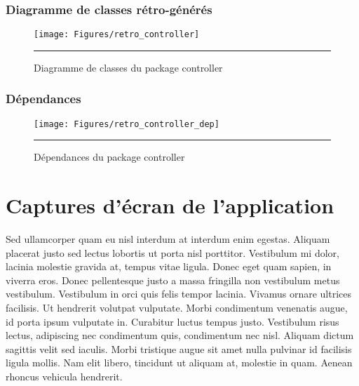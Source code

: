 \subsubsection{Diagramme de classes rétro-générés}
\begin{figure}[H]
	\centering
		\texttt{[image: Figures/retro\_controller]}
		\rule{35em}{0.5pt}
	\caption[Diagramme de classes du package controller]{Diagramme de classes du package controller}
\end{figure}
\subsubsection{Dépendances}

\begin{figure}[H]
	\centering
		\texttt{[image: Figures/retro\_controller\_dep]}
		\rule{35em}{0.5pt}
	\caption[Dépendances du package controller]{Dépendances du package controller}
\end{figure}



\section{Captures d'écran de l'application}

Sed ullamcorper quam eu nisl interdum at interdum enim egestas. Aliquam placerat justo sed lectus lobortis ut porta nisl porttitor. Vestibulum mi dolor, lacinia molestie gravida at, tempus vitae ligula. Donec eget quam sapien, in viverra eros. Donec pellentesque justo a massa fringilla non vestibulum metus vestibulum. Vestibulum in orci quis felis tempor lacinia. Vivamus ornare ultrices facilisis. Ut hendrerit volutpat vulputate. Morbi condimentum venenatis augue, id porta ipsum vulputate in. Curabitur luctus tempus justo. Vestibulum risus lectus, adipiscing nec condimentum quis, condimentum nec nisl. Aliquam dictum sagittis velit sed iaculis. Morbi tristique augue sit amet nulla pulvinar id facilisis ligula mollis. Nam elit libero, tincidunt ut aliquam at, molestie in quam. Aenean rhoncus vehicula hendrerit.